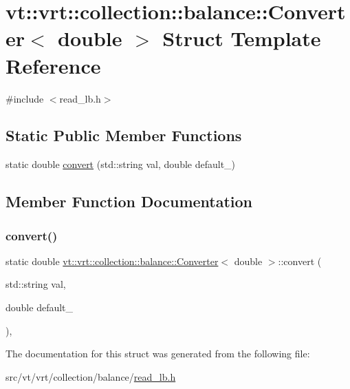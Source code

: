 \hypertarget{structvt_1_1vrt_1_1collection_1_1balance_1_1_converter_3_01double_01_4}{}\section{vt\+:\+:vrt\+:\+:collection\+:\+:balance\+:\+:Converter$<$ double $>$ Struct Template Reference}
\label{structvt_1_1vrt_1_1collection_1_1balance_1_1_converter_3_01double_01_4}


{\ttfamily \#include $<$read\+\_\+lb.\+h$>$}

\subsection*{Static Public Member Functions}
\begin{DoxyCompactItemize}
\item 
static double \hyperlink{structvt_1_1vrt_1_1collection_1_1balance_1_1_converter_3_01double_01_4_ada5a90823d588341cae52777b5d0537c}{convert} (std\+::string val, double default\+\_\+)
\end{DoxyCompactItemize}


\subsection{Member Function Documentation}
\mbox{\label{structvt_1_1vrt_1_1collection_1_1balance_1_1_converter_3_01double_01_4_ada5a90823d588341cae52777b5d0537c}} 
\subsubsection{\texorpdfstring{convert()}{convert()}}
{\footnotesize\ttfamily static double \hyperlink{structvt_1_1vrt_1_1collection_1_1balance_1_1_converter}{vt\+::vrt\+::collection\+::balance\+::\+Converter}$<$ double $>$\+::convert (\begin{DoxyParamCaption}\item[{std\+::string}]{val,  }\item[{double}]{default\+\_\+ }\end{DoxyParamCaption})\hspace{0.3cm}{\ttfamily [inline]}, {\ttfamily [static]}}



The documentation for this struct was generated from the following file\+:\begin{DoxyCompactItemize}
\item 
src/vt/vrt/collection/balance/\hyperlink{read__lb_8h}{read\+\_\+lb.\+h}\end{DoxyCompactItemize}
